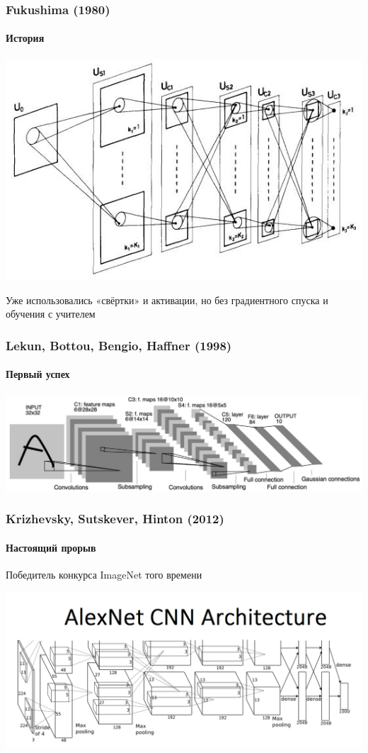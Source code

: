 \documentclass[fullscreen=true, bookmarks=true, hyperref={pdfencoding=unicode}]{beamer}
\begin{document}
\begin{frame}
  \frametitle{Fukushima (1980)}
  \framesubtitle{История}
  \begin{center}
    \includegraphics[keepaspectratio,
                     height=0.5\paperheight]{Fukushima_1980.png}
  \end{center}
  Уже использовались «свёртки» и активации, но без градиентного спуска и обучения с учителем
\end{frame}

\begin{frame}
  \frametitle{Lekun, Bottou, Bengio, Haffner (1998)}
  \framesubtitle{Первый успех}
  \begin{center}
    \includegraphics[keepaspectratio,
                     height=0.33\paperheight]{LeNet.jpg}
  \end{center}
\end{frame}

\begin{frame}
  \frametitle{Krizhevsky, Sutskever, Hinton (2012)}
  \framesubtitle{Настоящий прорыв}
  Победитель конкурса ImageNet того времени
  \begin{center}
    \includegraphics[keepaspectratio,
                     height=0.5\paperheight]{AlexNetCNN.png}
  \end{center}
\end{frame}
\end{document}
